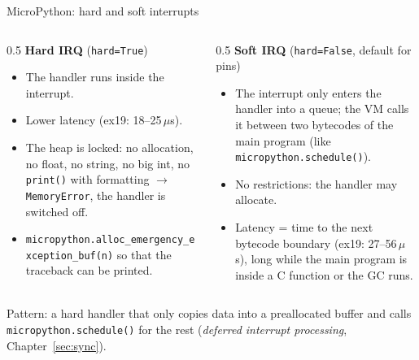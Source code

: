 \begin{frame}{MicroPython: hard and soft interrupts}
  \begin{columns}[T]
    \begin{column}{0.5\textwidth}
      \textbf{Hard IRQ} (\texttt{hard=True})
      \begin{itemize}\small
        \item The handler runs inside the interrupt.
        \item Lower latency (ex19: 18--25\,$\mu$s).
        \item The heap is locked: no allocation, no float, no string, no big int, no \texttt{print()} with formatting $\rightarrow$ \texttt{MemoryError}, the handler is switched off.
        \item \texttt{micropython.alloc\_emergency\_exception\_buf(n)} so that the traceback can be printed.
      \end{itemize}
    \end{column}
    \begin{column}{0.5\textwidth}
      \textbf{Soft IRQ} (\texttt{hard=False}, default for pins)
      \begin{itemize}\small
        \item The interrupt only enters the handler into a queue; the VM calls it between two bytecodes of the main program (like \texttt{micropython.schedule()}).
        \item No restrictions: the handler may allocate.
        \item Latency = time to the next bytecode boundary (ex19: 27--56\,$\mu$s), long while the main program is inside a C function or the GC runs.
      \end{itemize}
    \end{column}
  \end{columns}
  \medskip
  Pattern: a hard handler that only copies data into a preallocated buffer and calls \texttt{micropython.schedule()} for the rest (\emph{deferred interrupt processing}, Chapter~\ref{sec:sync}).
\end{frame}

